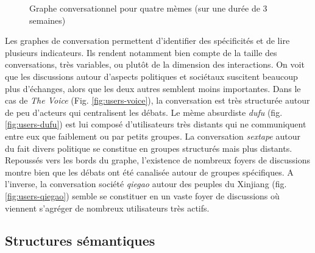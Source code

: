 \begin{figure}[htbp]
{    }
    
  \caption{  
    Graphe conversationnel pour quatre mèmes (sur une durée de 3 semaines)
  }
\end{figure}

Les graphes de conversation permettent d{\textquoteright}identifier des spécificités et de lire plusieurs indicateurs. Ils rendent notamment bien compte de la taille des conversations, très variables, ou plut\^ot de la dimension des interactions. On voit que les discussions autour d{\textquoteright}aspects politiques et sociétaux suscitent beaucoup plus d{\textquoteright}échanges, alors que les deux autres semblent moins importantes. Dans le cas de \textit{The Voice} (Fig. \ref{fig:users-voice}), la conversation est très structurée autour de peu d{\textquoteright}acteurs qui centralisent les débats. Le mème absurdiste \textit{dufu} (fig. \ref{fig:users-dufu}) est lui composé d{\textquoteright}utilisateurs très distants qui ne communiquent entre eux que faiblement ou par petits groupes. La conversation \textit{sextape }autour du fait divers politique se constitue en groupes structurés mais plus distants. Repoussés vers les bords du graphe, l{\textquoteright}existence de nombreux foyers de discussions montre bien que les débats ont été canalisée autour de groupes spécifiques. A l{\textquoteright}inverse, la conversation société \textit{qiegao} autour des peuples du Xinjiang (fig. \ref{fig:users-qiegao}) semble se constituer en un vaste foyer de discussions o\`u viennent s{\textquoteright}agréger de nombreux utilisateurs très actifs. 

\subsection[Structures sémantiques]{Structures sémantiques}

